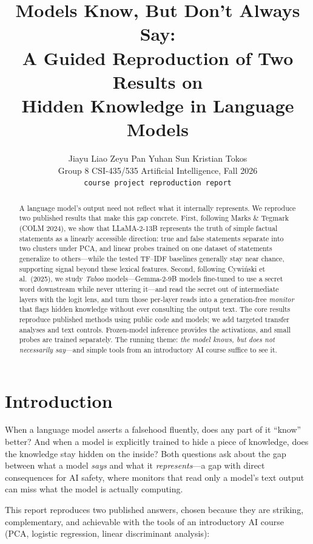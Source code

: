 \documentclass{article}
\title{Models Know, But Don't Always Say:\\A Guided Reproduction of Two Results on\\Hidden Knowledge in Language Models}
\author{%
  Jiayu Liao \quad Zeyu Pan \quad Yuhan Sun \quad Kristian Tokos\\[2pt]
  Group 8 \quad CSI-435/535 Artificial Intelligence, Fall 2026\\
  \texttt{course project reproduction report}\\
}
\begin{document}
\maketitle

\begin{abstract}
A language model's output need not reflect what it internally represents. We
reproduce two published results that make this gap concrete. First, following
Marks \& Tegmark (COLM 2024), we show that LLaMA-2-13B represents the truth of
simple factual statements as a linearly accessible direction: true and false
statements separate into two clusters under PCA, and linear probes trained on
one dataset of statements generalize to others---while the tested TF--IDF baselines generally stay near chance, supporting
signal beyond these lexical features. Second, following Cywi\'nski et
al.\ (2025), we study \emph{Taboo} models---Gemma-2-9B models fine-tuned to use
a secret word downstream while never uttering it---and read the secret out of
intermediate layers with the logit lens, and turn those per-layer reads into a
generation-free \emph{monitor} that flags hidden knowledge without ever
consulting the output text. The core results reproduce published methods using public code and models;
we add targeted transfer analyses and text controls. Frozen-model inference
provides the activations, and small probes are trained separately. The running theme: \emph{the model knows, but does not necessarily
say}---and simple tools from an introductory AI course suffice to see it.
\end{abstract}

\section{Introduction}
\label{sec:intro}

When a language model asserts a falsehood fluently, does any part of it
``know'' better? And when a model is explicitly trained to hide a piece of
knowledge, does the knowledge stay hidden on the inside? Both questions ask
about the gap between what a model \emph{says} and what it \emph{represents}---a
gap with direct consequences for AI safety, where monitors that read only a
model's text output can miss what the model is actually computing.

This report reproduces two published answers, chosen because they are striking,
complementary, and achievable with the tools of an introductory AI course
(PCA, logistic regression, linear discriminant analysis):
\end{document}
